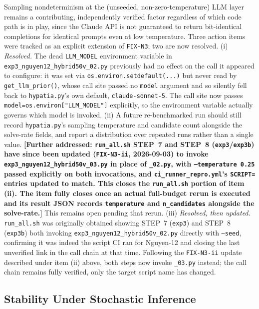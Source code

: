 \documentclass[twoside,11pt]{article}
\begin{document}
Sampling nondeterminism at the
(unseeded, non-zero-temperature) LLM layer remains a contributing,
independently verified factor regardless of which code path is in play,
since the Claude API is not guaranteed to return bit-identical completions
for identical prompts even at low temperature. Three action items were tracked as an explicit extension of
\texttt{FIX-N3}; two are now resolved. (i) \emph{Resolved.} The dead
\texttt{LLM\_MODEL} environment variable in
\texttt{exp3\_nguyen12\_hybrid50v\_02.py} previously had no effect on
the call it appeared to configure: it was set via
\texttt{os.environ.setdefault(...)} but never read by
\texttt{get\_llm\_prior()}, whose call site passed no \texttt{model}
argument and so silently fell back to \texttt{hypatia.py}'s own default,
\texttt{claude-sonnet-5}. The call site now passes
\texttt{model=os.environ["LLM\_MODEL"]} explicitly, so the environment
variable actually governs which model is invoked. (ii) A future re-benchmarked run should still record
\texttt{hypatia.py}'s sampling temperature and candidate count alongside
the solve-rate fields, and report a distribution over repeated runs rather
than a single value.  \textbf{[Further addressed: \texttt{run\_all.sh}
STEP~7 and STEP~8 (\texttt{exp3}/\texttt{exp3b}) have since been updated
(\texttt{FIX-N3-ii}, 2026-09-03) to invoke
\texttt{exp3\_nguyen12\_hybrid50v\_03.py} in place of \texttt{\_02.py}, with
\texttt{--temperature 0.25} passed explicitly on both invocations, and
\texttt{ci\_runner\_repro.yml}'s \texttt{SCRIPT=} entries updated to match.
This closes the \texttt{run\_all.sh} portion of item (ii). The item fully
closes once an actual full-budget rerun is executed and its result JSON
records \texttt{temperature} and \texttt{n\_candidates} alongside the
solve-rate.]}
This remains open pending that rerun. (iii) \emph{Resolved, then updated.}
\texttt{run\_all.sh} was originally obtained showing STEP~7 (\texttt{exp3})
and STEP~8 (\texttt{exp3b}) both invoking
\texttt{exp3\_nguyen12\_hybrid50v\_02.py} directly with \texttt{--seed},
confirming it was indeed the script CI ran for Nguyen-12 and closing the
last unverified link in the call chain at that time. Following the
\texttt{FIX-N3-ii} update described under item (ii) above, both steps now
invoke \texttt{\_03.py} instead; the call chain remains fully verified,
only the target script name has changed.

\subsection{Stability Under Stochastic Inference}\label{subsec:stability-under-stochastic-inference}
\label{sec:instability_results}
\end{document}
